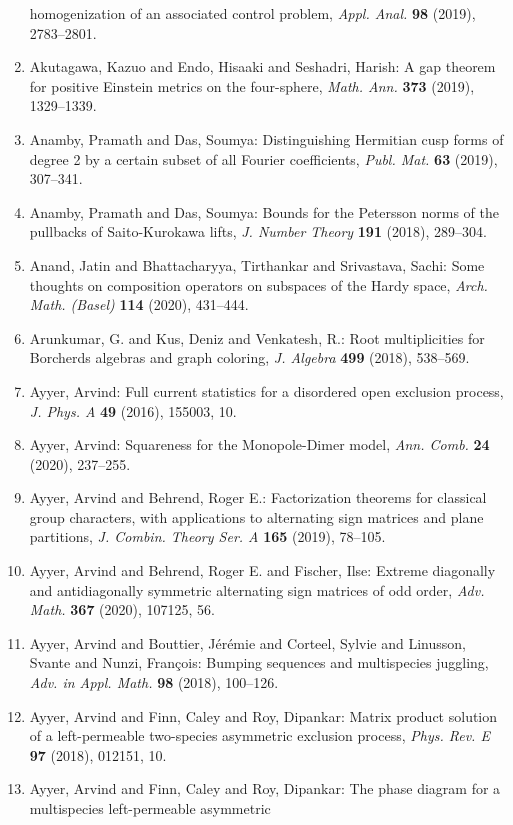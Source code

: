 \begin{enumerate}
homogenization of an associated control problem, \emph{Appl. Anal.} {\bf 98} (2019), 2783--2801.
\item Akutagawa, Kazuo and Endo, Hisaaki and Seshadri, Harish: A gap theorem for positive {E}instein metrics on the
four-sphere, \emph{Math. Ann.} {\bf 373} (2019), 1329--1339.
\item Anamby, Pramath and Das, Soumya: Distinguishing {H}ermitian cusp forms of degree 2 by a certain
subset of all {F}ourier coefficients, \emph{Publ. Mat.} {\bf 63} (2019), 307--341.
\item Anamby, Pramath and Das, Soumya: Bounds for the {P}etersson norms of the pullbacks of
{S}aito-{K}urokawa lifts, \emph{J. Number Theory} {\bf 191} (2018), 289--304.
\item Anand, Jatin and Bhattacharyya, Tirthankar and Srivastava,
Sachi: Some thoughts on composition operators on subspaces of the
{H}ardy space, \emph{Arch. Math. (Basel)} {\bf 114} (2020), 431--444.
\item Arunkumar, G. and Kus, Deniz and Venkatesh, R.: Root multiplicities for {B}orcherds algebras and graph
coloring, \emph{J. Algebra} {\bf 499} (2018), 538--569.
\item Ayyer, Arvind: Full current statistics for a disordered open exclusion
process, \emph{J. Phys. A} {\bf 49} (2016), 155003, 10.
\item Ayyer, Arvind: Squareness for the {M}onopole-{D}imer model, \emph{Ann. Comb.} {\bf 24} (2020), 237--255.
\item Ayyer, Arvind and Behrend, Roger E.: Factorization theorems for classical group characters, with
applications to alternating sign matrices and plane
partitions, \emph{J. Combin. Theory Ser. A} {\bf 165} (2019), 78--105.
\item Ayyer, Arvind and Behrend, Roger E. and Fischer, Ilse: Extreme diagonally and antidiagonally symmetric alternating
sign matrices of odd order, \emph{Adv. Math.} {\bf 367} (2020), 107125, 56.
\item Ayyer, Arvind and Bouttier, J\'{e}r\'{e}mie and Corteel, Sylvie and
Linusson, Svante and Nunzi, Fran\c{c}ois: Bumping sequences and multispecies juggling, \emph{Adv. in Appl. Math.} {\bf 98} (2018), 100--126.
\item Ayyer, Arvind and Finn, Caley and Roy, Dipankar: Matrix product solution of a left-permeable two-species
asymmetric exclusion process, \emph{Phys. Rev. E} {\bf 97} (2018), 012151, 10.
\item Ayyer, Arvind and Finn, Caley and Roy, Dipankar: The phase diagram for a multispecies left-permeable asymmetric

\end{enumerate}

